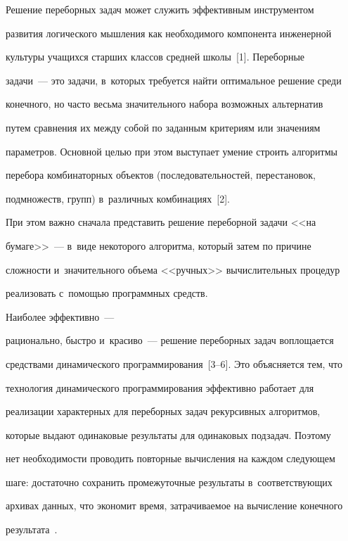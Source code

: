     Решение переборных задач может служить эффективным инструментом 


развития логического мышления как необходимого компонента инженерной 


культуры учащихся старших классов средней школы~[1]. Переборные  


задачи~--- это задачи, в~которых требуется найти оптимальное решение среди 


конечного, но часто весьма значительного набора возможных альтернатив 


путем сравнения их между собой по заданным критериям или значениям 


параметров. Основной целью при этом выступает умение строить алгоритмы 


перебора комбинаторных объектов (последовательностей, перестановок, 


подмножеств, групп) в~различных комбинациях~[2]. 




    При этом важно сначала представить решение переборной задачи <<на 


бумаге>>~--- в~виде некоторого алгоритма, который затем по причине 


сложности и~значительного объема <<ручных>> вычислительных процедур 


реализовать с~помощью программных средств.





 Наиболее эффективно~--- 


рационально, быстро и~красиво~--- решение переборных задач воплощается 


средствами динамического программирования~[3--6]. Это объясняется тем, что 


технология динамического программирования эффективно работает для 


реализации характерных для переборных задач рекурсивных алгоритмов, 


которые выдают одинаковые результаты для одинаковых подзадач. Поэтому 


нет необходимости проводить повторные вычисления на каждом следующем 


шаге: достаточно сохранить промежуточные результаты в~соответствующих 


архивах данных, что экономит время, затрачиваемое на вычисление конечного 


результата~\cite[с.~49]{3-kor}. 


